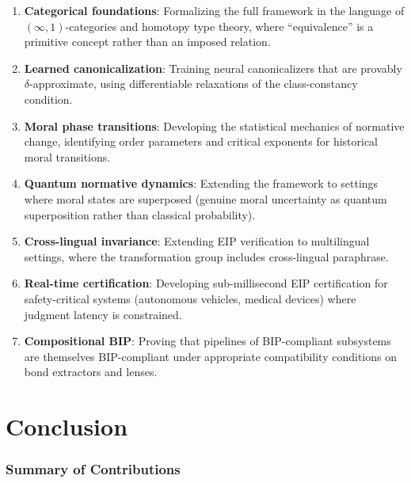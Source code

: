 \documentclass[12pt,letterpaper]{article}
\theoremstyle{definition}
\theoremstyle{plain}
\begin{document}
\begin{enumerate}
    \item \textbf{Categorical foundations}: Formalizing the full framework in the language of $(\infty,1)$-categories and homotopy type theory, where ``equivalence'' is a primitive concept rather than an imposed relation.

    \item \textbf{Learned canonicalization}: Training neural canonicalizers that are provably $\delta$-approximate, using differentiable relaxations of the class-constancy condition.

    \item \textbf{Moral phase transitions}: Developing the statistical mechanics of normative change, identifying order parameters and critical exponents for historical moral transitions.

    \item \textbf{Quantum normative dynamics}: Extending the framework to settings where moral states are superposed (genuine moral uncertainty as quantum superposition rather than classical probability).

    \item \textbf{Cross-lingual invariance}: Extending EIP verification to multilingual settings, where the transformation group includes cross-lingual paraphrase.

    \item \textbf{Real-time certification}: Developing sub-millisecond EIP certification for safety-critical systems (autonomous vehicles, medical devices) where judgment latency is constrained.

    \item \textbf{Compositional BIP}: Proving that pipelines of BIP-compliant subsystems are themselves BIP-compliant under appropriate compatibility conditions on bond extractors and lenses.
\end{enumerate}


\part{Conclusion}
\label{part:conclusion}

\section{Summary of Contributions}
\end{document}
